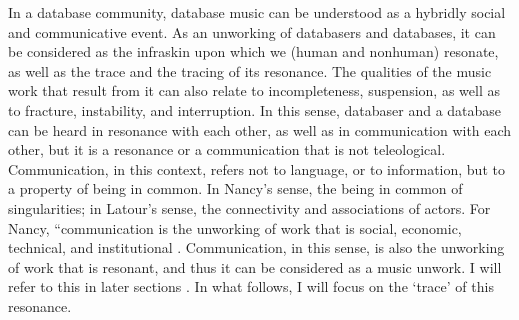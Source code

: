 In a database community, database music can be understood as a hybridly social and communicative event. As an unworking of databasers and databases, it can be considered as the infraskin upon which we (human and nonhuman) resonate, as well as the trace and the tracing of its resonance. The qualities of the music work that result from it can also relate to incompleteness, suspension, as well as to fracture, instability, and interruption. In this sense, databaser and a database can be heard in resonance with each other, as well as in communication with each other, but it is a resonance or a communication that is not teleological. Communication, in this context, refers not to language, or to information, but to a property of being in common. In Nancy's sense, the being in common of singularities; in Latour's sense, the connectivity and associations of actors. For Nancy, ``communication is the unworking of work that is social, economic, technical, and institutional \parencite[31]{Nan91:The}. Communication, in this sense, is also the unworking of work that is resonant, and thus it can be considered as a music unwork. I will refer to this in later sections . In what follows, I will focus on the `trace' of this resonance.

